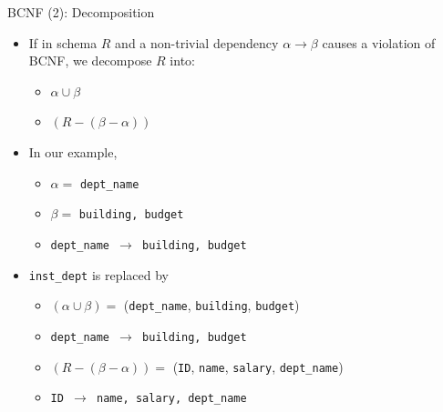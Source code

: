 \documentclass[aspectratio=169, xcolor=dvipsnames]{beamer}
\begin{document}
\begin{frame}{BCNF (2): Decomposition}
    \begin{itemize}[<+->]
        \item If in schema $R$ and a non-trivial dependency $\alpha \rightarrow \beta$ causes a violation of BCNF, we decompose $R$ into:
        \begin{itemize}
            \item[$\triangleright$] $\alpha \cup \beta$
            \item[$\triangleright$] $(R - (\beta - \alpha))$
        \end{itemize}
        \item In our example,
        \begin{itemize}
            \item[$\triangleright$] $\alpha=$ \texttt{dept\_name}
            \item[$\triangleright$] $\beta=$ \texttt{building, budget}
            \item[$\triangleright$] \texttt{dept\_name $\rightarrow$ building, budget}
        \end{itemize}
        \item \texttt{inst\_dept} is replaced by
        \begin{itemize}
            \item[$\triangleright$] $(\alpha \cup \beta) =$ (\texttt{dept\_name}, \texttt{building}, \texttt{budget})
            \item[$\triangleright$] \texttt{dept\_name $\rightarrow$ building, budget}
            \item[$\triangleright$] $(R - (\beta - \alpha)) =$ (\texttt{ID}, \texttt{name}, \texttt{salary}, \texttt{dept\_name})
            \item[$\triangleright$] \texttt{ID $\rightarrow$ name, salary, dept\_name}
        \end{itemize}
    \end{itemize}
\end{frame}
\end{document}
